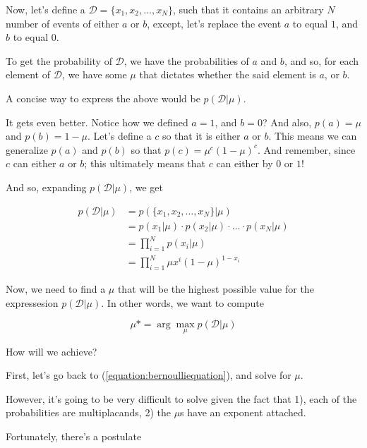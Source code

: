 \documentclass{tufte-handout}
\begin{document}
Now, let's define a $\mathcal{D} = \{x_1, x_2, \ldots, x_N\}$, such that it contains an arbitrary $N$ number of events of either $a$ or $b$, except, let's replace the event $a$ to equal $1$, and $b$ to equal $0$.

To get the probability of $\mathcal{D}$, we have the probabilities of $a$ and $b$, and so, for each element of $\mathcal{D}$, we have some $\mu$ that dictates whether the said element is $a$, or $b$.

A concise way to express the above would be $p(\mathcal{D}|\mu)$.

It gets even better. Notice how we defined $a = 1$, and $b = 0$? And also, $p(a) = \mu$ and $p(b) = 1 - \mu$. Let's define a $c$ so that it is either $a$ or $b$. This means we can generalize $p(a)$ and $p(b)$ so that $p(c) = \mu^c(1 - \mu)^c$. And remember, since $c$ can either $a$ or $b$; this ultimately means that $c$ can either by $0$ or $1$!

And so, expanding $p(\mathcal{D}|\mu)$, we get

\begin{equation} \label{equation:bernoulliequation}
  \begin{aligned}
    p(\mathcal{D}|\mu) &= p(\{x_1, x_2, \dots, x_N\}|\mu) \\
                       &= p(x_1|\mu) \cdot p(x_2|\mu) \cdot \ldots \cdot p(x_N|\mu) \\
                       &= \prod_{i = 1}^N p(x_i|\mu) \\
                       &= \prod_{i = 1}^N \mu x^i(1 - \mu)^{1 - x_i}
  \end{aligned}
\end{equation}

Now, we need to find a $\mu$ that will be the highest possible value for the
expressesion $p(\mathcal{D}|\mu)$. In other words, we want to compute

\begin{equation}
  \mu* = \arg \max\limits_{\mu}p(\mathcal{D}|\mu)
\end{equation}

How will we achieve?

First, let's go back to (\ref{equation:bernoulliequation}), and solve for $\mu$.

However, it's going to be very difficult to solve given the fact that 1), each
of the probabilities are multiplacands, 2) the $\mu$s have an exponent attached.

Fortunately, there's a postulate
\end{document}
